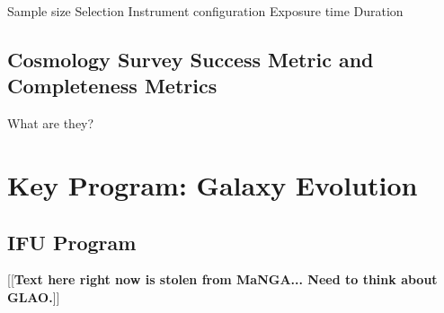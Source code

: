 \documentclass[11pt,a4paper,twoside,onecolumn,openany,final,oldfontcommands]{memoir}
\newcommand{\edit}[2][todo]{{\color{#1}[[{\bf #2}]]}}
\begin{document}
\begin{programrequirement}

\reqitem Sample size
\reqitem Selection 
\reqitem Instrument configuration 
\reqitem Exposure time
\reqitem Duration

\end{programrequirement}

\section{Cosmology Survey Success Metric and Completeness Metrics}

What are they?

\newpage


\chapter{Key Program: Galaxy Evolution}\label{prog:galaxies}

\section{IFU Program}\label{prog:galaxies-IFU}

\edit{Text here right now is stolen from MaNGA...  Need to think about GLAO.}
\end{document}
